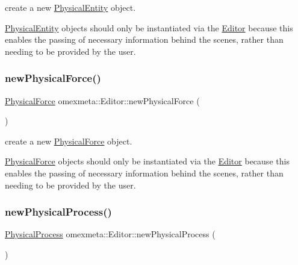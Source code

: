create a new \hyperlink{classomexmeta_1_1PhysicalEntity}{Physical\+Entity} object. 

\hyperlink{classomexmeta_1_1PhysicalEntity}{Physical\+Entity} objects should only be instantiated via the \hyperlink{classomexmeta_1_1Editor}{Editor} because this enables the passing of necessary information behind the scenes, rather than needing to be provided by the user. \mbox{\label{classomexmeta_1_1Editor_a58d21ef09f3dc5a6a66dbafe34150695}} 
\subsubsection{\texorpdfstring{new\+Physical\+Force()}{newPhysicalForce()}}
{\footnotesize\ttfamily \hyperlink{classomexmeta_1_1PhysicalForce}{Physical\+Force} omexmeta\+::\+Editor\+::new\+Physical\+Force (\begin{DoxyParamCaption}{ }\end{DoxyParamCaption})}



create a new \hyperlink{classomexmeta_1_1PhysicalForce}{Physical\+Force} object. 

\hyperlink{classomexmeta_1_1PhysicalForce}{Physical\+Force} objects should only be instantiated via the \hyperlink{classomexmeta_1_1Editor}{Editor} because this enables the passing of necessary information behind the scenes, rather than needing to be provided by the user. \mbox{\label{classomexmeta_1_1Editor_a2815d918736ee17d07306c5cf07c8ebf}} 
\subsubsection{\texorpdfstring{new\+Physical\+Process()}{newPhysicalProcess()}}
{\footnotesize\ttfamily \hyperlink{classomexmeta_1_1PhysicalProcess}{Physical\+Process} omexmeta\+::\+Editor\+::new\+Physical\+Process (\begin{DoxyParamCaption}{ }\end{DoxyParamCaption})}



